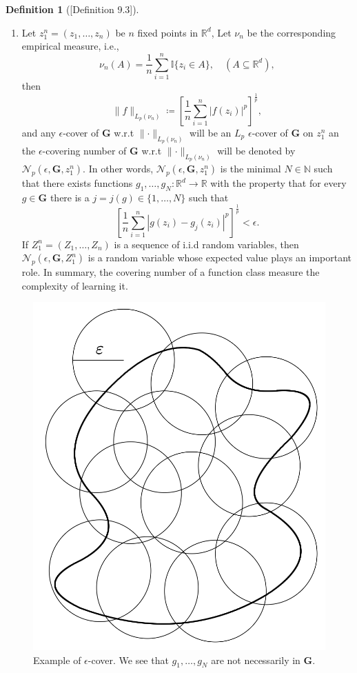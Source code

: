 \documentclass[a4paper]{article}
\theoremstyle{definition}
\newtheorem{definition}{Definition}
\theoremstyle{remark}
\theoremstyle{plain}
\newcommand{\bG}{\mathbf{G}}
\newcommand{\cN}{\mathcal{N}}
\newcommand{\R}{\mathbb{R}}
\newcommand{\N}{\mathbb{N}}
\newcommand{\II}{\mathbb{I}}
\begin{document}
\begin{definition}[{\normalfont\citet{gyorfi2002distribution}[Definition 9.3]}]
\begin{enumerate}[label=(\alph*)]
        \item Let $z_1^n = (z_1, \dots, z_n)$ be $n$ fixed points in $\R^d$, Let $\nu_n$ be the corresponding empirical measure, i.e.,
        \begin{equation*}
            \nu_n(A) = \frac{1}{n} \sum_{i = 1}^{n}\II\{z_i \in A\}, \quad (A \subseteq \R^d),
        \end{equation*}
        then 
        \begin{equation*}
        \lVert f \rVert_{L_p(\nu_n)} \coloneq \left[\frac{1}{n}\sum_{i=1}^{n} |f(z_i)|^p\right]^\frac{1}{p},
    \end{equation*}
    and any $\epsilon$-cover of $\bG$ w.r.t $\lVert \cdot \rVert_{L_p(\nu_n)}$ will be an $L_p$ $\epsilon$-cover of $\bG$ on $z_1^n$ an the $\epsilon$-covering number of $\bG$ w.r.t $\lVert \cdot \rVert_{L_p(\nu_n)}$ will be denoted by $\cN_p\left(\epsilon, \bG, z_1^n \right)$. In other words, $\cN_p\left(\epsilon, \bG, z_1^n \right)$ is the minimal $N \in \N$ such that there exists functions $g_1, \dots, g_N: \R^d \to \R$ with the property that for every $g \in \bG$ there is a $j = j(g) \in \{ 1, \dots, N\}$ such that
    \begin{equation*}
        \left[\frac{1}{n}\sum_{i=1}^{n}\left\lvert g(z_i) - g_j(z_i)\right\rvert^p\right]^\frac{1}{p} < \epsilon.
    \end{equation*}
    If $Z^n_1 = (Z_1, \dots, Z_n)$ is a sequence of i.i.d random variables, then $\cN_p\left(\epsilon, \bG, Z_1^n \right)$ is a random variable whose expected value plays an important role. In summary, the covering number of a function class measure the complexity of learning it.
    \end{enumerate}
\end{definition}
\begin{figure}[tb]
    \centering
    \includegraphics[width=0.5\linewidth]{pics/epsilon_cover.png}
    \caption{Example of $\epsilon$-cover. We see that $g_1, \dots, g_N$ are not necessarily in $\bG$.}
\end{figure}
\end{document}
